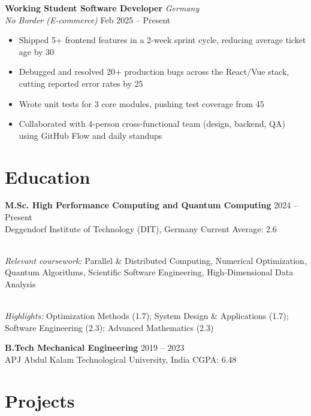 \documentclass[11pt,a4paper]{article}
\newcommand{\entryheader}[4]{%
    \textbf{#1} \hfill \textit{#2}\\
    \textit{#3} \hfill #4
}
\begin{document}
\entryheader{ Working Student Software Developer }{ Germany }{ No Border (E-commerce) }{ Feb 2025 – Present }
\begin{itemize}[leftmargin=*,nosep,topsep=2pt]
    
    \item Shipped 5+ frontend features in a 2-week sprint cycle, reducing average ticket age by 30%
    
    \item Debugged and resolved 20+ production bugs across the React/Vue stack, cutting reported error rates by 25%
    
    \item Wrote unit tests for 3 core modules, pushing test coverage from 45%
    
    \item Collaborated with 4-person cross-functional team (design, backend, QA) using GitHub Flow and daily standups
    
\end{itemize}


\section{Education}

\textbf{ M.Sc. High Performance Computing and Quantum Computing } \hfill 2024 – Present\\
Deggendorf Institute of Technology (DIT), Germany \hfill Current Average: 2.6

\\\textit{Relevant coursework:} Parallel & Distributed Computing, Numerical Optimization, Quantum Algorithms, Scientific Software Engineering, High-Dimensional Data Analysis


\\\textit{Highlights:} Optimization Methods (1.7); System Design & Applications (1.7); Software Engineering (2.3); Advanced Mathematics (2.3)


\textbf{ B.Tech Mechanical Engineering } \hfill 2019 – 2023\\
APJ Abdul Kalam Technological University, India \hfill CGPA: 6.48




\section{Projects}
\end{document}
